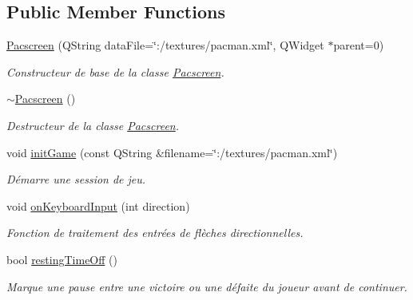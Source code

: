 \subsection*{Public Member Functions}
\begin{DoxyCompactItemize}
\item 
\hyperlink{class_pacscreen_a28ad19885d3b4ebff6ec8fca42fe177a}{Pacscreen} (Q\+String data\+File=\char`\"{}\+:/textures/pacman.\+xml\char`\"{}, Q\+Widget $\ast$parent=0)
\begin{DoxyCompactList}\small\item\em Constructeur de base de la classe \hyperlink{class_pacscreen}{Pacscreen}. \end{DoxyCompactList}\item 
\hypertarget{class_pacscreen_a4c4bd0bef62cc02bd3798b4d20cd765f}{}\hyperlink{class_pacscreen_a4c4bd0bef62cc02bd3798b4d20cd765f}{$\sim$\+Pacscreen} ()\label{class_pacscreen_a4c4bd0bef62cc02bd3798b4d20cd765f}

\begin{DoxyCompactList}\small\item\em Destructeur de la classe \hyperlink{class_pacscreen}{Pacscreen}. \end{DoxyCompactList}\item 
void \hyperlink{class_pacscreen_a3320b3943d0e14e262f2aac35f4f0028}{init\+Game} (const Q\+String \&filename=\char`\"{}\+:/textures/pacman.\+xml\char`\"{})
\begin{DoxyCompactList}\small\item\em Démarre une session de jeu. \end{DoxyCompactList}\item 
void \hyperlink{class_pacscreen_afc8132b62b670a5bffc59abffda2ba5d}{on\+Keyboard\+Input} (int direction)
\begin{DoxyCompactList}\small\item\em Fonction de traitement des entrées de flèches directionnelles. \end{DoxyCompactList}\item 
bool \hyperlink{class_pacscreen_a99449fdac361b7d947204e4298dabcea}{resting\+Time\+Off} ()
\begin{DoxyCompactList}\small\item\em Marque une pause entre une victoire ou une défaite du joueur avant de continuer. \end{DoxyCompactList}\end{DoxyCompactItemize}
